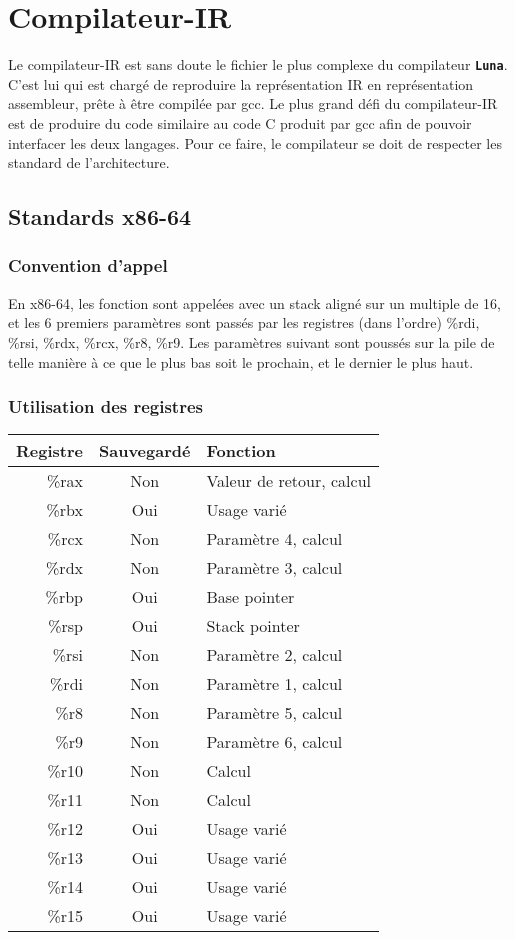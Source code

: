 \documentclass{article}
\newcommand{\luna}{\textbf{\texttt{Luna}}}
\newcommand{\R}[1]{\%{}{#1}}
\begin{document}
\newpage
\section{Compilateur-IR}
Le compilateur-IR est sans doute le fichier le plus complexe du compilateur \luna{}. C'est lui qui est chargé de reproduire la représentation IR en représentation assembleur, prête à être compilée par gcc. Le plus grand défi du compilateur-IR est de produire du code similaire au code C produit par gcc afin de pouvoir interfacer les deux langages. Pour ce faire, le compilateur se doit de respecter les standard de l'architecture.

\subsection{Standards x86-64}
\subsubsection{Convention d'appel}
En x86-64, les fonction sont appelées avec un stack aligné sur un multiple de 16, et les 6 premiers paramètres sont passés par les registres (dans l'ordre) \R{rdi}, \R{rsi}, \R{rdx}, \R{rcx}, \R{r8}, \R{r9}. Les paramètres suivant sont poussés sur la pile de telle manière à ce que le plus bas soit le prochain, et le dernier le plus haut.

\subsubsection{Utilisation des registres}
\begin{center}
  \begin{tabular}{r|c|p{12cm}}
    Registre & Sauvegardé & Fonction \\
    \hline
    \R{rax} & Non & Valeur de retour, calcul\\
    \R{rbx} & Oui & Usage varié\\
    \R{rcx} & Non & Paramètre 4, calcul\\
    \R{rdx} & Non & Paramètre 3, calcul\\
    \R{rbp} & Oui & Base pointer\\
    \R{rsp} & Oui & Stack pointer\\
    \R{rsi} & Non & Paramètre 2, calcul\\
    \R{rdi} & Non & Paramètre 1, calcul\\
    \R{r8}  & Non & Paramètre 5, calcul\\
    \R{r9}  & Non & Paramètre 6, calcul\\
    \R{r10} & Non & Calcul\\
    \R{r11} & Non & Calcul\\
    \R{r12} & Oui & Usage varié\\
    \R{r13} & Oui & Usage varié\\
    \R{r14} & Oui & Usage varié\\
    \R{r15} & Oui & Usage varié\\
  \end{tabular}
\end{center}
\end{document}

